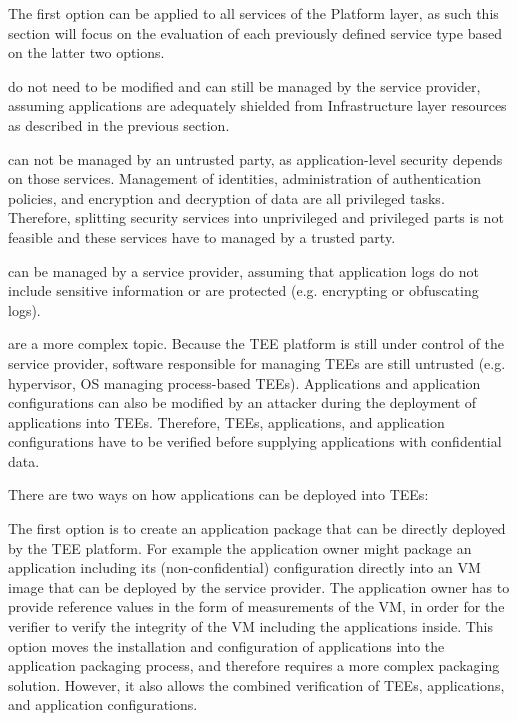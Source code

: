 The first option can be applied to all services of the Platform layer, as such
this section will focus on the evaluation of each previously defined service
type based on the latter two options.

\begin{description}[style=standard]
  \item[Infrastructure Management Services] do not need to be modified and can
    still be managed by the service provider, assuming applications are
    adequately shielded from Infrastructure layer resources as described in the
    previous section.

  \item[Security Services] can not be managed by an untrusted party, as
    application-level security depends on those services. Management of
    identities, administration of authentication policies, and encryption and
    decryption of data are all privileged tasks. Therefore, splitting security
    services into unprivileged and privileged parts is not feasible and these
    services have to managed by a trusted party.

  \item[Monitoring and Logging Services] can be managed by a service provider,
    assuming that application logs do not include sensitive information or are
    protected (e.g. encrypting or obfuscating logs).

  \item[Application Orchestration Services] are a more complex topic. Because
    the TEE platform is still under control of the service provider, software
    responsible for managing TEEs are still untrusted (e.g. hypervisor, OS
    managing process-based TEEs). Applications and application configurations
    can also be modified by an attacker during the deployment of applications
    into TEEs. Therefore, TEEs, applications, and application configurations
    have to be verified before supplying applications with confidential data.

    There are two ways on how applications can be deployed into TEEs:

    The first option is to create an application package that can be directly
    deployed by the TEE platform. For example the application owner might
    package an application including its (non-confidential) configuration
    directly into an VM image that can be deployed by the service provider. The
    application owner has to provide reference values in the form of
    measurements of the VM, in order for the verifier to verify the integrity of
    the VM including the applications inside. This option moves the installation
    and configuration of applications into the application packaging process,
    and therefore requires a more complex packaging solution. However, it also
    allows the combined verification of TEEs, applications, and application
    configurations.


\end{description}
